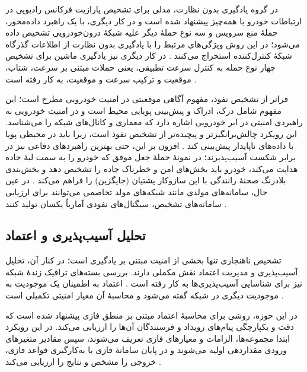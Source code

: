 در گروه یادگیری بدون نظارت، مدلی برای تشخیص پارازیت فرکانس رادیویی  در ارتباطات خودرو با همه‌چیز پیشنهاد شده است \cite{farsimadanReviewSecurityChallenges2025} و در کار دیگری، با یک راهبرد داده‌محور، حملهٔ منع سرویس و سه نوع حملهٔ دیگر علیه شبکهٔ درون‌خودرویی تشخیص داده می‌شود؛ در این روش ویژگی‌های مرتبط را با یادگیری بدون نظارت از اطلاعات گذرگاه شبکهٔ کنترل‌کننده  استخراج می‌کنند \cite{farsimadanReviewSecurityChallenges2025}. در کار دیگری نیز یادگیری ماشین برای تشخیص چهار نوع حمله به کنترل سرعت تطبیقی، یعنی حملات مبتنی بر سرعت، شتاب، موقعیت و ترکیب سرعت و موقعیت، به کار رفته است \cite{farsimadanReviewSecurityChallenges2025}.

فراتر از تشخیص نفوذ، مفهوم آگاهی موقعیتی  در امنیت خودرویی مطرح است؛ این مفهوم شامل درک، ادراک و پیش‌بینی پویایی محیط است و در امنیت خودرویی به راهبردی امنیتی در ابر خودرویی اشاره دارد که معماری و کانال‌های شبکه را می‌شناسد. این رویکرد چالش‌برانگیزتر و پیچیده‌تر از تشخیص نفوذ است، زیرا باید در محیطی پویا با داده‌های ناپایدار پیش‌بینی کند \cite{farsimadanReviewSecurityChallenges2025}. افزون بر این، حتی بهترین راهبردهای دفاعی نیز در برابر شکست آسیب‌پذیرند؛ در نمونهٔ حملهٔ جعل  موفق که خودرو را به سمت لبهٔ جاده هدایت می‌کند، خودرو باید بخش‌های امن و خطرناک جاده را تشخیص دهد و بخش‌بندی بلادرنگ صحنهٔ رانندگی با  این سازوکار پشتیان (جایگزین) را فراهم می‌کند \cite{farsimadanReviewSecurityChallenges2025}. در عین حال، سامانه‌های مولدی مانند شبکه‌های مولد تخاصمی  می‌توانند برای ارزیابی سامانه‌های تشخیص، سیگنال‌های نفوذی آماریاً یکسان تولید کنند \cite{farsimadanReviewSecurityChallenges2025}.

\subsection{تحلیل آسیب‌پذیری و اعتماد}

تشخیص ناهنجاری تنها بخشی از امنیت مبتنی بر یادگیری است؛ در کنار آن، تحلیل آسیب‌پذیری و مدیریت اعتماد نقش مکملی دارند. بررسی بسته‌های ترافیک زندهٔ شبکه نیز برای شناسایی آسیب‌پذیری‌ها به کار رفته است \cite{farsimadanReviewSecurityChallenges2025}. اعتماد به اطمینان یک موجودیت به موجودیت دیگری در شبکه گفته می‌شود و محاسبهٔ آن معیار امنیتی تکمیلی است \cite{farsimadanReviewSecurityChallenges2025}.

در این حوزه، روشی برای محاسبهٔ اعتماد مبتنی بر منطق فازی  پیشنهاد شده است که دقت و یکپارچگی پیام‌های رویداد و فرستندگان آن‌ها را ارزیابی می‌کند. در این رویکرد ابتدا مجموعه‌ها، الزامات و معیارهای فازی تعریف می‌شوند، سپس مقادیر متغیرهای ورودی مقداردهی اولیه می‌شوند و در پایان سامانهٔ فازی با به‌کارگیری قواعد فازی، خروجی را مشخص و نتایج را ارزیابی می‌کند \cite{farsimadanReviewSecurityChallenges2025}.


